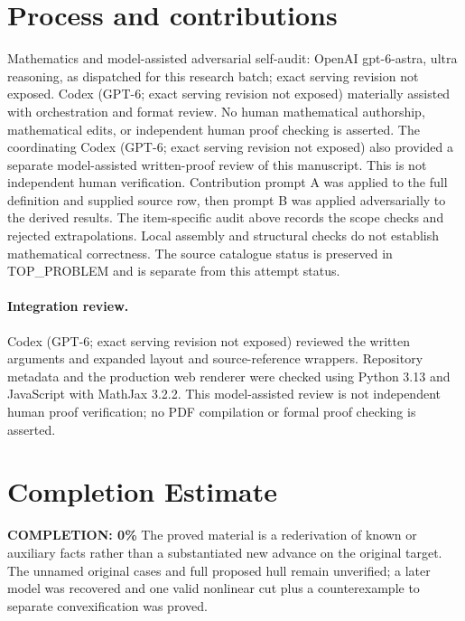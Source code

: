 \documentclass[11pt]{article}
\begin{document}
\section{Process and contributions}
Mathematics and model-assisted adversarial self-audit: OpenAI gpt-6-astra, ultra reasoning, as dispatched for this research batch; exact serving revision not exposed. Codex (GPT-6; exact serving revision not exposed) materially assisted with orchestration and format review. No human mathematical authorship, mathematical edits, or independent human proof checking is asserted.
The coordinating Codex (GPT-6; exact serving revision not exposed) also provided a separate model-assisted written-proof review of this manuscript. This is not independent human verification.
Contribution prompt A was applied to the full definition and supplied source row, then prompt B was applied adversarially to the derived results. The item-specific audit above records the scope checks and rejected extrapolations. Local assembly and structural checks do not establish mathematical correctness. The source catalogue status is preserved in TOP\_PROBLEM and is separate from this attempt status.
\paragraph{Integration review.} Codex (GPT-6; exact serving revision not exposed) reviewed the written arguments and expanded layout and source-reference wrappers. Repository metadata and the production web renderer were checked using Python 3.13 and JavaScript with MathJax 3.2.2. This model-assisted review is not independent human proof verification; no PDF compilation or formal proof checking is asserted.

\section{Completion Estimate}
\noindent\textbf{COMPLETION: 0\%}
The proved material is a rederivation of known or auxiliary facts rather than a substantiated new advance on the original target. The unnamed original cases and full proposed hull remain unverified; a later model was recovered and one valid nonlinear cut plus a counterexample to separate convexification was proved.
\end{document}
